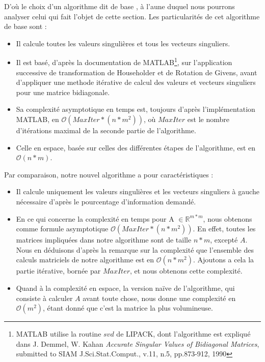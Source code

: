 \documentclass[a4paper,12pt]{article}
\begin{document}
        D'où le choix d'un algorithme dit \og de base \fg, à l'aune duquel nous
        pourrons analyser celui qui fait l'objet de cette section.  Les
        particularités de cet algorithme \og de base \fg sont :

        \begin{itemize}
        \item Il calcule toutes les valeurs singulières et tous les vecteurs
            singuliers.

        \item Il est basé, d'après la documentation de
            MATLAB\footnote{MATLAB utilise la routine $svd$ de LIPACK, dont
            l'algorithme est expliqué dans J. Demmel, W. Kahan
            \emph{Accurate Singular Values of Bidiagonal Matrices},
            submitted to SIAM J.Sci.Stat.Comput., v.11, n.5, pp.873-912,
            1990}, sur l'application successive de transformation de Householder
            et de Rotation de Givens, avant d'appliquer une methode itérative de
            calcul des valeurs et vecteurs singuliers pour une matrice
            bidiagonale.

        \item Sa complexité asymptotique en temps est, toujours d'après
            l'implémentation MATLAB, en $\mathcal{O}(MaxIter*(n*m^2))$, où
            $MaxIter$ est le nombre d'itérations maximal de la seconde
            partie de l'algorithme.

        \item Celle en espace, basée sur celles des différentes étapes de
            l'algorithme, est en $\mathcal{O}(n*m)$.
        \end{itemize}

    \bigskip

        Par comparaison, notre nouvel algorithme a pour caractéristiques :

        \begin{itemize}
        \item Il calcule uniquement les valeurs singulières et les vecteurs
            singuliers à gauche nécessaire d'après le pourcentage d'information
            demandé.

        \item En ce qui concerne la complexité en temps pour A $\in
            \mathbb{R}^{m*m}$, nous obtenons comme formule asymptotique
            $\mathcal{O}(MaxIter*(n*m^2))$. En effet, toutes les matrices
            impliquées dans notre algorithme sont de taille $n*m$, excepté $A$.
            Nous en déduisons d'après la remarque sur la complexité que
            l'ensemble des calculs matriciels de notre algorithme est en
            $\mathcal{O}(n*m^2)$.  Ajoutons a cela la partie itérative, bornée
            par $MaxIter$, et nous obtenons cette complexité.

        \item Quand à la complexité en espace, la version naïve de l'algorithme,
            qui consiste à calculer $A$ avant toute chose, nous donne une
            complexité en $\mathcal{O}(m^2)$, étant donné que c'est la matrice
            la plus volumineuse.
        \end{itemize}
\end{document}
